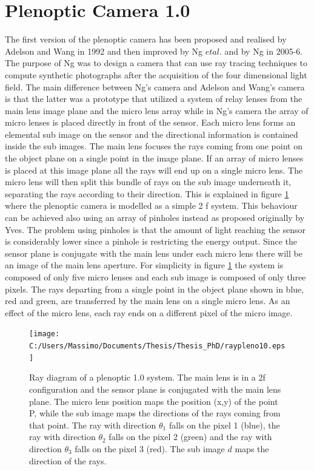 \section{Plenoptic Camera 1.0}
\label{sec:camera10}
The first version of the plenoptic camera has been proposed and realised by Adelson and Wang in 1992 \cite{adelson1992single} and then improved by Ng $et al.$ \cite{ng2005light} and by Ng \cite{ng2006digital}in 2005-6.\\ The purpose of Ng was to design a camera that can use ray tracing techniques to compute synthetic photographs after the acquisition of the four dimensional light field. The main difference between Ng's camera and Adelson and Wang's camera is that the latter was a prototype that utilized a system of relay lenses from the main lens image plane and the micro lens array \cite{ng2005light} while in Ng's camera the array of micro lenses is placed directly in front of the sensor. Each micro lens forms an elemental sub image on the sensor and the directional information is contained inside the sub images. The main lens focuses the rays coming from one point on the object plane on a single point in the image plane. If an array of micro lenses is placed at this image plane all the rays will end up on a single micro lens. The micro lens will then split this bundle of rays on the sub image underneath it, separating the rays according to their direction. This is explained in figure \ref{fig:plenoptic3} where the plenoptic camera is modelled as a simple 2 f system. This behaviour can be achieved also using an array of pinholes instead as proposed originally by Yves. The problem using pinholes is that the amount of light reaching the sensor is considerably lower since a pinhole is restricting the energy output. Since the sensor plane is conjugate with the main lens under each micro lens there will be an image of the main lens aperture. For simplicity in figure \ref{fig:plenoptic3} the system is composed of only five micro lenses and each sub image is composed of only three pixels. The rays departing from a single point in the object plane shown in blue, red and green, are transferred by the main lens on a single micro lens. As an effect of the micro lens, each ray ends on a different pixel of the micro image.
\begin{figure}[H]
\centering
\texttt{[image: C:/Users/Massimo/Documents/Thesis/Thesis\_PhD/raypleno10.eps]}
\caption{\label{fig:plenoptic3}Ray diagram of a plenoptic 1.0 system. The main lens is in a 2f configuration and the sensor plane is conjugated with the main lens plane. The micro lens position maps the position (x,y) of the point P, while the sub image maps the directions of the rays coming from that point. The ray with direction $\theta_1$ falls on the pixel 1 (blue), the ray with direction $\theta_2$ falls on the pixel 2 (green) and the ray with direction $\theta_3$ falls on the pixel 3 (red). The sub image $d$ maps the direction of the rays.  }
\end{figure}
